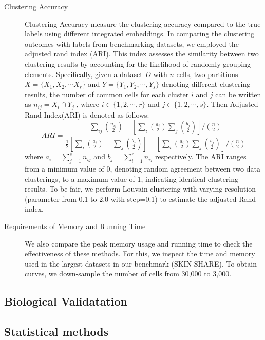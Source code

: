 \begin{description}
	\item[Clustering Accuracy] Clustering Accuracy measure the clustering accuracy compared to the true labels using different integrated embeddings. In comparing the clustering outcomes with labels from benchmarking datasets, we employed the adjusted rand index (ARI)\citep{hubert1985ARI}. This index assesses the similarity between two clustering results by accounting for the likelihood of randomly grouping elements. Specifically, given a dataset $D$ with $n$ cells, two partitions $ X = \{ X_{1}, X_{2}, \cdots X_{r} \} $ and $ Y = \{ Y_{1}, Y_{2}, \cdots, Y_{s} \} $ denoting different clustering results, the number of common cells for each cluster $i$ and $j$ can be written as $n_{ij} = X_{i} \cap Y_{j} |$, where $ i \in \{1, 2, \cdots, r \} $ and $ j \in \{1, 2, \cdots, s \} $. Then Adjusted Rand Index(ARI) is denoted as follows:
	\begin{equation}
		ARI = \frac{\sum_{ij} {n_{ij} \choose 2} - [ \sum_{i} {a_{i} \choose 2} \sum_{j} {b_{j} \choose 2 } ] / {n \choose 2}}{\frac{1}{2} [\sum_{i} {a_{i} \choose 2 } + \sum_{j} {b_{j} \choose 2}] - [\sum_{i} {a_{i} \choose 2} \sum_{j} {b_{j} \choose 2 } ] / {n \choose 2} }
	\end{equation}
	where $ a_{i} = \sum_{j=1}^{s} n_{ij} $ and $ b_{j} = \sum_{i=1}^{r} n_{ij} $ respectively. The ARI ranges from a minimum value of 0, denoting random agreement between two data clusterings, to a maximum value of 1, indicating identical clustering results.  To be fair, we perform Louvain clustering with varying resolution (parameter from 0.1 to 2.0 with step=0.1) to estimate the adjusted Rand index. 
	\item[Requirements of Memory and Running Time] We also compare the peak memory usage and running time to check the effectiveness of these methods. For this, we inspect the time and memory used in the largest datasets in our benchmark (SKIN-SHARE). To obtain curves, we down-sample the number of cells from 30,000 to 3,000.
\end{description}

\subsection{Biological Validatation}


\subsection{Statistical methods}



